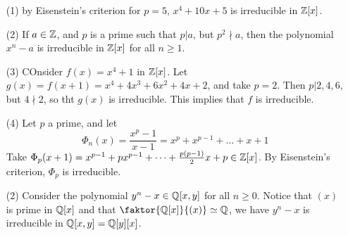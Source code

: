 \begin{example}\label{example_7.6}
    \begin{enumerate}
        \item[(1)] by Eisenstein's criterion for $p=5$,  $x^4+10x+5$ is
            irreducible in  $\mathbb{Z}[x]$.

        \item[(2)] If $a \in \mathbb{Z}$, and  $p$ is a prime such that  $p|a$, but $p^2
            \nmid a$, then the polynomial $x^n-a$ is irreducible in  $\mathbb{Z}[x]$ for
            all $n \geq 1$.

        \item[(3)] COnsider $f(x)=x^4+1$ in $\mathbb{Z}[x]$. Let
            $g(x)=f(x+1)=x^4+4x^3+6x^2+4x+2$, and take $p=2$. Then  $p|2,4,6$, but
            $4 \nmid 2$, so tht  $g(x)$ is irreducible. This implies that $f$ is
            irreducible.

        \item[(4)] Let $p$ a prime, and let
            \begin{equation*}
                \Phi_n(x)=\frac{x^p-1}{x-1}=x^p+x^{p-1}+\dots+x+1
            \end{equation*}
            Take $\Phi_p(x+1)=x^{p-1}+px^{p-1}+\dots+\frac{p(p-1)}{2}x+p \in \mathbb{Z}[x]$.
            By Eisenstein's criterion, $\Phi_p$ is irreducible.

        \item[(2)] Consider the polynomial $y^n-x \in \mathbb{Q}[x,y]$ for all $n \geq
            0$. Notice that  $(x)$ is prime in $\mathbb{Q}[x]$ and that
            $\faktor{\Q[x]}{(x)} \simeq \Q$, we have $y^n-x$ is irreducible in
            $\mathbb{Q}[x,y]=\mathbb{Q}[y][x]$.

    \end{enumerate}
\end{example}
